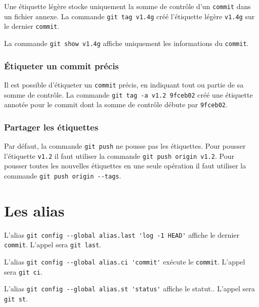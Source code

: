 \documentclass[11pt,twoside,headings=normal,open=right,french,DIV=12]{scrreprt}
\newcommand{\spec}[1]{\texttt{#1}}
\begin{document}
    Une étiquette légère stocke uniquement la somme de contrôle d'un \spec{commit} dans un fichier annexe. La commande
    \verb|git tag v1.4g| créé l'étiquette légère \verb|v1.4g| sur le dernier \spec{commit}.
    
    \smallskip
    
    La commande \verb|git show v1.4g| affiche uniquement les informations du \spec{commit}.



\subsubsection{\'Etiqueter un commit précis}    



    Il est possible d'étiqueter un \spec{commit} précis, en indiquant tout ou partie de sa somme de contrôle. La commande \verb|git tag -a v1.2 9fceb02| créé une étiquette annotée pour le commit dont la
    somme de contrôle débute par \verb|9fceb02|.



\subsubsection{Partager les étiquettes}



    Par défaut, la commande \verb|git push| ne pousse pas les étiquettes. Pour pousser l'étiquette \verb|v1.2| il faut
    utiliser la commande \verb|git push origin v1.2|. Pour pousser toutes les nouvelles étiquettes en une seule opération il faut utiliser
    la commande \verb|git push origin --tags|.



\section{Les alias}


   
    L'alias \verb|git config --global alias.last 'log -1 HEAD'| affiche le dernier \spec{commit}. L'appel sera
    \verb|git last|.

    \smallskip
    
    L'alias \verb|git config --global alias.ci 'commit'| exécute le \spec{commit}. L'appel sera \verb|git ci|.

    \smallskip
    
    L'alias \verb|git config --global alias.st 'status'| affiche le statut.. L'appel sera \verb|git st|.
\end{document}
